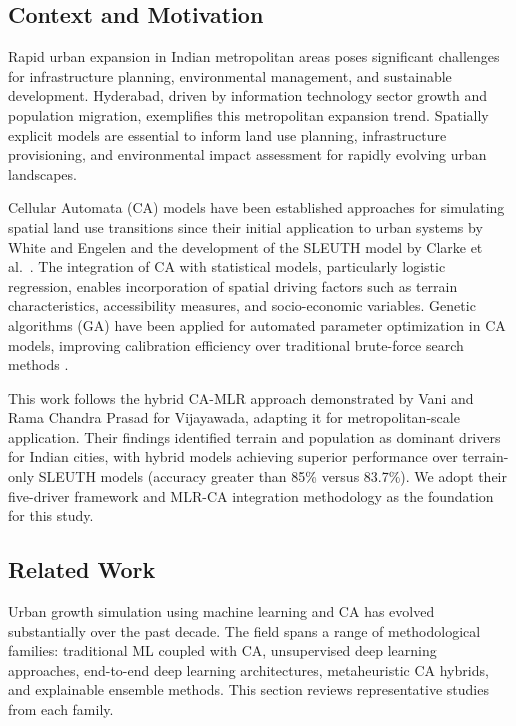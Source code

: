 \documentclass[conference]{IEEEtran}
\begin{document}
\subsection{Context and Motivation}
Rapid urban expansion in Indian metropolitan areas poses significant challenges for infrastructure planning, environmental management, and sustainable development. Hyderabad, driven by information technology sector growth and population migration, exemplifies this metropolitan expansion trend. Spatially explicit models are essential to inform land use planning, infrastructure provisioning, and environmental impact assessment for rapidly evolving urban landscapes.

Cellular Automata (CA) models have been established approaches for simulating spatial land use transitions since their initial application to urban systems by White and Engelen \cite{white1993} and the development of the SLEUTH model by Clarke et al.\ \cite{clarke1997}. The integration of CA with statistical models, particularly logistic regression, enables incorporation of spatial driving factors such as terrain characteristics, accessibility measures, and socio-economic variables. Genetic algorithms (GA) have been applied for automated parameter optimization in CA models, improving calibration efficiency over traditional brute-force search methods \cite{wu2002, goldberg1989}.

This work follows the hybrid CA-MLR approach demonstrated by Vani and Rama Chandra Prasad \cite{vani2022} for Vijayawada, adapting it for metropolitan-scale application. Their findings identified terrain and population as dominant drivers for Indian cities, with hybrid models achieving superior performance over terrain-only SLEUTH models (accuracy greater than 85\% versus 83.7\%). We adopt their five-driver framework and MLR-CA integration methodology as the foundation for this study.

\subsection{Related Work}
Urban growth simulation using machine learning and CA has evolved substantially over the past decade. The field spans a range of methodological families: traditional ML coupled with CA, unsupervised deep learning approaches, end-to-end deep learning architectures, metaheuristic CA hybrids, and explainable ensemble methods. This section reviews representative studies from each family.
\end{document}
